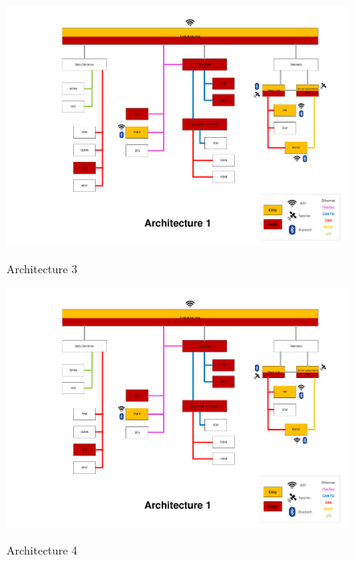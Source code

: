 \begin{figure}[h]
    \centering
    \caption{Architecture 3}
    \includegraphics[width=\textwidth, page=3]{../Architectures-survey.pdf}
    \label{fig:architecture3}
\end{figure}

\begin{figure}[h]
    \centering
    \caption{Architecture 4}
    \includegraphics[width=\textwidth, page=4]{../Architectures-survey.pdf}
    \label{fig:architecture4}
\end{figure}

